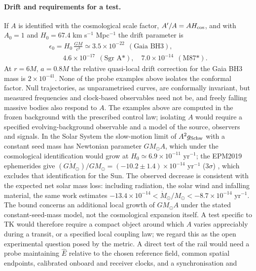 \documentclass[12pt]{iopart}
\theoremstyle{plain}
\theoremstyle{definition}
\theoremstyle{remark}
\newcommand{\Ehat}{\hat E}
\begin{document}
\paragraph{Drift and requirements for a test.}
If $A$ is identified with the cosmological scale factor, $A'/A=AH_{\rm cos}$, and
with $A_0=1$ and $H_0=67.4$ km s$^{-1}$ Mpc$^{-1}$ \cite{Planck2020VI} the drift
parameter is
\begin{equation}
    \begin{array}{l}
    \displaystyle\epsilon_0=H_0\,\frac{GM}{c^3}\simeq
    3.5\times10^{-22}\ \ (\mbox{Gaia BH3}),\\[4pt]
    \qquad 4.6\times10^{-17}\ \ (\mbox{Sgr A*}),\quad
    7.0\times10^{-14}\ \ (\mbox{M87*}).
    \end{array}
    \label{eq:obs-drift}
\end{equation}
At $r=6M$, $a=0.8M$ the relative quasi-local drift correction for the Gaia BH3
mass is $2\times10^{-41}$. None of the probe examples above isolates the
conformal factor. Null trajectories, as unparametrised curves, are conformally
invariant, but measured frequencies and clock-based observables need not be, and
freely falling massive bodies also respond to $A$. The examples above are computed
in the frozen background with the prescribed control law; isolating $A$ would
require a specified evolving-background observable and a model of the source,
observers and signals. In the Solar System the slow-motion limit of
$A^2g_{\rm Schw}$ with a constant seed mass has Newtonian parameter
$GM_\odot A$, which under the cosmological identification would grow at
$H_0\simeq6.9\times10^{-11}$ yr$^{-1}$; the EPM2019 ephemerides give
$\dot{(GM_\odot)}/GM_\odot=(-10.2\pm1.4)\times10^{-14}$ yr$^{-1}$ ($3\sigma$)
\cite{Pitjeva2021}, which excludes that identification for the Sun. The observed
decrease is consistent with the expected net solar mass loss: including radiation,
the solar wind and infalling material, the same work estimates
$-13.4\times10^{-14}<\dot M_\odot/M_\odot<-8.7\times10^{-14}$ yr$^{-1}$. The bound
concerns an additional local growth of $GM_\odot A$ under the stated constant-seed-mass
model, not the cosmological expansion itself. A test
specific to TK would therefore require a compact object around which $A$ varies
appreciably during a transit, or a specified local coupling law; we regard this
as the open experimental question posed by the metric. A direct test of the rail would need a probe
maintaining $\Ehat$ relative to the chosen reference field, common spatial
endpoints, calibrated onboard and receiver clocks, and a synchronisation and
\end{document}
